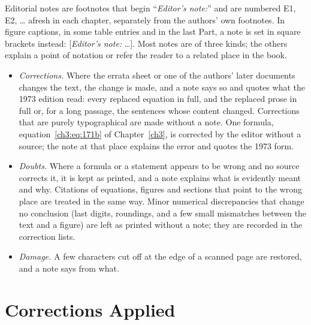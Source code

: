 Editorial notes are footnotes that begin ``\emph{Editor's note:}'' and are numbered E1, E2,
\ldots{} afresh in each chapter, separately from the authors' own footnotes. In figure captions, in
some table entries and in the last Part, a note is set in square brackets instead:
[\emph{Editor's note:} \ldots]. Most notes are of three kinds; the others explain a point of
notation or refer the reader to a related place in the book.
\begin{itemize}
  \item \emph{Corrections.} Where the errata sheet or one of the authors' later documents changes
    the text, the change is made, and a note says so and quotes what the 1973 edition read: every
    replaced equation in full, and the replaced prose in full or, for a long passage, the sentences
    whose content changed. Corrections that are purely typographical are made without a note. One
    formula, equation~\eqref{ch3:eq:171b} of Chapter~\ref{ch3}, is corrected by the editor without a
    source; the note at that place explains the error and quotes the 1973 form.
  \item \emph{Doubts.} Where a formula or a statement appears to be wrong and no source corrects
    it, it is kept as printed, and a note explains what is evidently meant and why. Citations of
    equations, figures and sections that point to the wrong place are treated in the same way.
    Minor numerical discrepancies that change no conclusion (last digits, roundings, and a few
    small mismatches between the text and a figure) are left as printed without a note; they are
    recorded in the correction lists.
  \item \emph{Damage.} A few characters cut off at the edge of a scanned page are restored, and a
    note says from what.
\end{itemize}

\section*{Corrections Applied}

